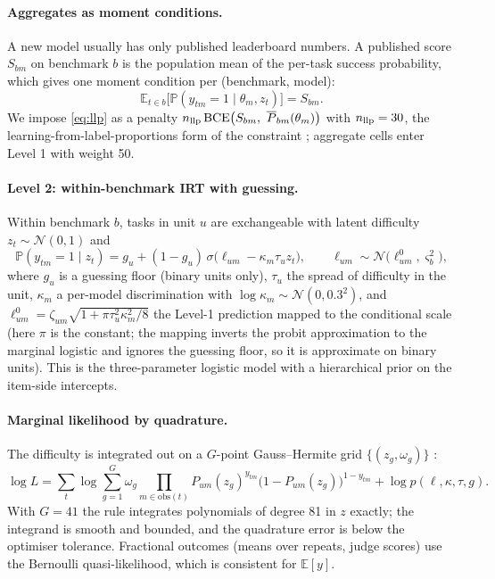 \documentclass[11pt,a4paper]{article}
\theoremstyle{definition}
\theoremstyle{remark}
\theoremstyle{definition}
\newcommand{\E}{\mathbb{E}}
\renewcommand{\Pr}{\mathbb{P}}
\begin{document}
\paragraph{Aggregates as moment conditions.}
A new model usually has only published leaderboard numbers. A published score $S_{bm}$ on benchmark $b$ is the population mean of the per-task success probability, which gives one moment condition per (benchmark, model):
\begin{equation}
\E_{t\in b}\big[\Pr(y_{tm}=1\mid\theta_m,z_t)\big]=S_{bm}.
\label{eq:llp}
\end{equation}
We impose \eqref{eq:llp} as a penalty $n_{\rm llp}\,\mathrm{BCE}\big(S_{bm},\ \overline{P}_{bm}(\theta_m)\big)$ with $n_{\rm llp}=30$, the learning-from-label-proportions form of the constraint \cite{quadrianto2009}; aggregate cells enter Level 1 with weight 50.

\paragraph{Level 2: within-benchmark IRT with guessing.}
Within benchmark $b$, tasks in unit $u$ are exchangeable with latent difficulty $z_t\sim\mathcal N(0,1)$ and
\begin{equation}
\Pr(y_{tm}=1\mid z_t)=g_u+(1-g_u)\,\sigma\!\big(\ell_{um}-\kappa_m\tau_u z_t\big),\qquad
\ell_{um}\sim\mathcal N\big(\ell^0_{um},\varsigma_b^2\big),
\label{eq:irt}
\end{equation}
where $g_u$ is a guessing floor (binary units only), $\tau_u$ the spread of difficulty in the unit, $\kappa_m$ a per-model discrimination with $\log\kappa_m\sim\mathcal N(0,0.3^2)$, and $\ell^0_{um}=\zeta_{um}\sqrt{1+\pi\tau_u^2\kappa_m^2/8}$ the Level-1 prediction mapped to the conditional scale (here $\pi$ is the constant; the mapping inverts the probit approximation to the marginal logistic and ignores the guessing floor, so it is approximate on binary units). This is the three-parameter logistic model \cite{birnbaum1968,lord1980} with a hierarchical prior on the item-side intercepts.

\paragraph{Marginal likelihood by quadrature.}
The difficulty is integrated out on a $G$-point Gauss--Hermite grid $\{(z_g,\omega_g)\}$ \cite{bock1981,abramowitz1964}:
\begin{equation}
\log L=\sum_t\log\sum_{g=1}^{G}\omega_g\prod_{m\in\mathrm{obs}(t)}P_{um}(z_g)^{y_{tm}}\big(1-P_{um}(z_g)\big)^{1-y_{tm}}+\log p(\ell,\kappa,\tau,g).
\label{eq:ghq}
\end{equation}
With $G=41$ the rule integrates polynomials of degree 81 in $z$ exactly; the integrand is smooth and bounded, and the quadrature error is below the optimiser tolerance. Fractional outcomes (means over repeats, judge scores) use the Bernoulli quasi-likelihood, which is consistent for $\E[y]$.
\end{document}
